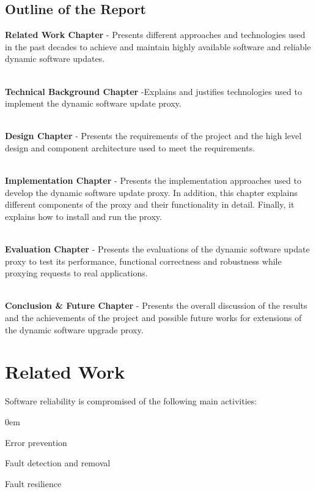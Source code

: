 \documentclass[a4paper,11pt,twoside]{report}
\begin{document}
\section{Outline of the Report}
\textbf{Related Work Chapter} - Presents different approaches and technologies used in the past decades to achieve and maintain highly available software and reliable dynamic software updates. 

\noindent \\
\textbf{Technical Background Chapter} -Explains and justifies technologies used to implement the dynamic software update proxy.

\noindent \\
\textbf{ Design Chapter} - Presents the requirements of the project and the high level design and component architecture used to meet the requirements.

\noindent \\
\textbf{Implementation Chapter} - Presents the implementation approaches used to develop the dynamic software update proxy. In addition, this chapter explains different components of the proxy and their functionality in detail. Finally, it explains how to install and run the proxy.   

\noindent \\
\textbf{Evaluation Chapter} - Presents the evaluations of the dynamic software update proxy to test its performance, functional correctness and robustness while proxying requests to real applications. 

\noindent \\
\textbf{Conclusion \& Future Chapter} - Presents the overall discussion of the results and the achievements of the project and possible future works for extensions of the dynamic software upgrade proxy. 

\chapter{Related Work}
Software reliability is compromised of the following main activities:

  \begin{list}{-}{}
  \itemsep0em
  \item Error prevention 
  
  \item Fault detection and removal
  
  \item Fault resilience
  \end{list}
\end{document}
